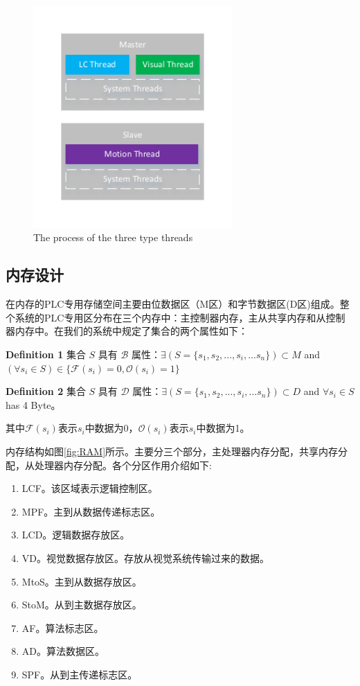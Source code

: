 \documentclass[journal,UTF8]{IEEEtran}
\begin{document}
\begin{figure}
	\centering
	\includegraphics[width=3in]{fig/Threads.pdf}
	\caption{ The process of the three type threads}
	\label{fig:Threads}
\end{figure}
\subsection{内存设计}
在内存的PLC专用存储空间主要由位数据区（M区）和字节数据区(D区)组成。整个系统的PLC专用区分布在三个内存中：主控制器内存，主从共享内存和从控制器内存中。在我们的系统中规定了集合的两个属性如下：

\textbf{Definition 1} 集合 $S$ 具有 $\mathcal{B}$ 属性：$\exists (S=\{s_1,s_2,...,s_i,...s_n\}) \subset M$ and $(\forall s_{i} \in S) \in \{\mathcal{F}(s_i) = 0,\mathcal{O}(s_i) = 1\} $

\textbf{Definition 2} 集合 $S$ 具有 $\mathcal{D}$ 属性：$\exists (S=\{s_1,s_2,...,s_i,...s_n\}) \subset D$ and $\forall s_{i} \in S$ has 4 Byte。

其中$\mathcal{F}(s_i)$表示$s_i$中数据为0，$\mathcal{O}(s_i)$表示$s_i$中数据为1。

内存结构如图\ref{fig:RAM}所示。主要分三个部分，主处理器内存分配，共享内存分配，从处理器内存分配。各个分区作用介绍如下:
\begin{enumerate}
	\item LCF。该区域表示逻辑控制区。
	\item MPF。主到从数据传递标志区。
	\item LCD。逻辑数据存放区。
	\item VD。视觉数据存放区。存放从视觉系统传输过来的数据。
	\item MtoS。主到从数据存放区。
	\item StoM。从到主数据存放区。
	\item AF。算法标志区。
	\item AD。算法数据区。
	\item SPF。从到主传递标志区。
\end{enumerate}
\end{document}
